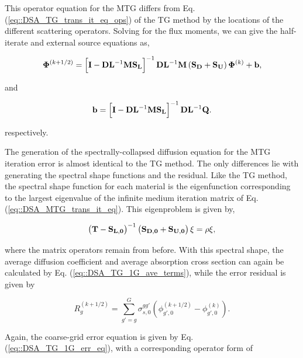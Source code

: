 \noindent This operator equation for the MTG differs from Eq. (\ref{eq::DSA_TG_trans_it_eq_ops}) of the TG method by the locations of the different scattering operators. Solving for the flux moments, we can give the half-iterate and external source equations as,

\begin{equation}
\label{eq::DSA_MTG_half_it_sol}
{\bf \Phi}^{(k+1/2)} = \left[ {\bf I} - {\bf D}{\bf L}^{-1} {\bf M}{\bf S_L}\right]^{-1} {\bf D}{\bf L}^{-1}  {\bf M} \left(  {\bf S_D} + {\bf S_U} \right) {\bf \Phi}^{(k)} + {\bf b} ,
\end{equation}

\noindent and

\begin{equation}
\label{eq::DSA_MTG_half_it_forcingfunc}
{\bf b} = \left[ {\bf I} - {\bf D}{\bf L}^{-1} {\bf M} {\bf S_L} \right]^{-1} {\bf D}{\bf L}^{-1}  {\bf Q} .
\end{equation}

\noindent respectively. 

The generation of the spectrally-collapsed diffusion equation for the MTG iteration error is almost identical to the TG method. The only differences lie with generating the spectral shape functions and the residual. Like the TG method, the spectral shape function for each material is the eigenfunction corresponding to the largest eigenvalue of the infinite medium iteration matrix of Eq. (\ref{eq::DSA_MTG_trans_it_eq}). This eigenproblem is given by,

\begin{equation}
\label{eq::DSA_MTG_eigenpprob}
\left(  {\bf T} - {\bf S_{L,0}}  \right)^{-1} \left( {\bf S_{D,0}}+ {\bf S_{U,0}} \right)\xi = \rho \xi ,
\end{equation}

\noindent where the matrix operators remain from before. With this spectral shape, the average diffusion coefficient and average absorption cross section can again be calculated by Eq. (\ref{eq::DSA_TG_1G_ave_terms}), while the error residual is given by

\begin{equation}
\label{eq::DSA_MTG_diff_residual}
R_g^{(k+1/2)} = \sum_{g'=g}^G \sigma_{s,0}^{g g'} \left( \phi_{g',0}^{(k+1/2)} - \phi_{g',0}^{(k)} \right) .
\end{equation}

\noindent Again, the coarse-grid error equation is given by Eq. (\ref{eq::DSA_TG_1G_err_eq}), with a corresponding operator form of 

